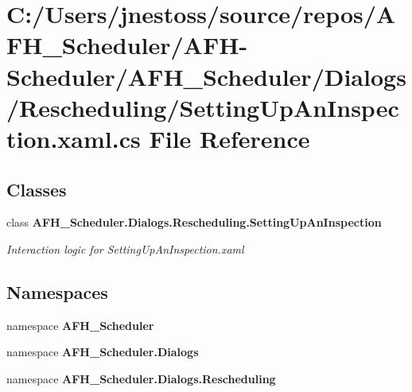 \section{C\+:/\+Users/jnestoss/source/repos/\+A\+F\+H\+\_\+\+Scheduler/\+A\+F\+H-\/\+Scheduler/\+A\+F\+H\+\_\+\+Scheduler/\+Dialogs/\+Rescheduling/\+Setting\+Up\+An\+Inspection.xaml.\+cs File Reference}
\label{_setting_up_an_inspection_8xaml_8cs}
\subsection*{Classes}
\begin{DoxyCompactItemize}
\item 
class \textbf{ A\+F\+H\+\_\+\+Scheduler.\+Dialogs.\+Rescheduling.\+Setting\+Up\+An\+Inspection}
\begin{DoxyCompactList}\small\item\em Interaction logic for Setting\+Up\+An\+Inspection.\+xaml \end{DoxyCompactList}\end{DoxyCompactItemize}
\subsection*{Namespaces}
\begin{DoxyCompactItemize}
\item 
namespace \textbf{ A\+F\+H\+\_\+\+Scheduler}
\item 
namespace \textbf{ A\+F\+H\+\_\+\+Scheduler.\+Dialogs}
\item 
namespace \textbf{ A\+F\+H\+\_\+\+Scheduler.\+Dialogs.\+Rescheduling}
\end{DoxyCompactItemize}
